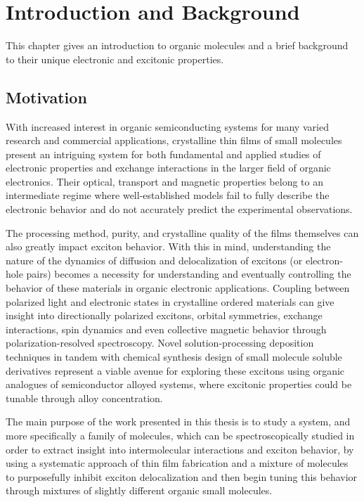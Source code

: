 \chapter{Introduction and Background} \label{chap: LaneChapter1}




This chapter gives an introduction to organic molecules and a brief background to their unique electronic and excitonic properties.



\section{Motivation}



With increased interest in organic semiconducting systems for many varied research and commercial applications, crystalline thin films of small molecules present an intriguing system for both fundamental and applied studies of electronic properties and exchange interactions in the larger field of organic electronics.  Their optical, transport and magnetic properties belong to an intermediate regime where well-established models fail to fully describe the electronic behavior and do not accurately predict the experimental observations.  



The processing method, purity, and crystalline quality of the films themselves can also greatly impact exciton behavior.  With this in mind, understanding the nature of the dynamics of diffusion and delocalization of excitons (or electron-hole pairs) becomes a necessity for understanding and eventually controlling the behavior of these materials in organic electronic applications.  Coupling between polarized light and electronic states in crystalline ordered materials can give insight into directionally polarized excitons, orbital symmetries, exchange interactions, spin dynamics and even collective magnetic behavior through polarization-resolved spectroscopy.  Novel solution-processing deposition techniques in tandem with chemical synthesis design of small molecule soluble derivatives represent a viable avenue for exploring these excitons using organic analogues of semiconductor alloyed systems, where excitonic properties could be tunable through alloy concentration. 



The main purpose of the work presented in this thesis is to study a system, and more specifically a family of molecules, which can be spectroscopically studied in order to extract insight into intermolecular interactions and exciton behavior, by using a systematic approach of thin film fabrication and a mixture of molecules to purposefully inhibit exciton delocalization and then begin tuning this behavior through mixtures of slightly different organic small molecules. 



